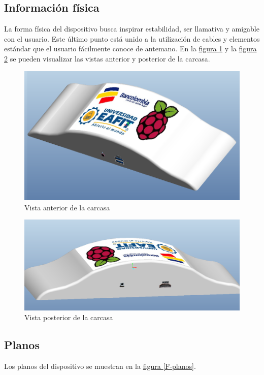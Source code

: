 \documentclass[11pt,lettersize]{article} %
\newcommand{\figura}[1]{\hyperref[{#1}]{figura \ref*{#1}}}
\begin{document}
\subsection{Información  física}
La forma física del dispositivo busca inspirar estabilidad, ser llamativa y amigable con el usuario. Este último punto está unido a la utilización de cables y elementos estándar que el usuario fácilmente conoce de antemano. En la \figura{F-carcasa-anterior} y la \figura{F-carcasa-posterior} se pueden visualizar las vistas anterior y posterior de la carcasa.

\begin{figure}[h!]
	\centering
	\includegraphics[width=.6\textwidth]{images/carcasa-anterior.png}
	\caption{Vista anterior de la carcasa}
	\label{F-carcasa-anterior}
\end{figure}
\begin{figure}[h!]
	\centering
	\includegraphics[width=.6\textwidth]{images/carcasa-posterior.png}
	\caption{Vista posterior de la carcasa}
	\label{F-carcasa-posterior}
\end{figure}


\subsection{Planos}
Los planos del dispositivo se muestran en la \figura{F-planos}.
\cleardoublepage
 \label{F-planos}
\end{document}
